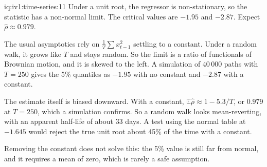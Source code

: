 \begin{solution}{iq:iv1:time-series:11}
Under a unit root, the regressor is non-stationary, so the statistic has a non-normal limit. The critical values are $-1.95$ and $-2.87$. Expect $\hat{\rho} \approx 0.979$.

The usual asymptotics rely on $\frac{1}{T}\sum x_{t - 1}^2$ settling to a constant. Under a random walk, it grows like $T$ and stays random. So the limit is a ratio of functionals of Brownian motion, and it is skewed to the left. A simulation of $40\,000$ paths with $T = 250$ gives the 5\% quantiles as $-1.95$ with no constant and $-2.87$ with a constant.

The estimate itself is biased downward. With a constant, $\mathbb{E}\hat{\rho} \approx 1 - 5.3/T$, or $0.979$ at $T = 250$, which a simulation confirms. So a random walk looks mean-reverting, with an apparent half-life of about 33 days. A test using the normal table at $-1.645$ would reject the true unit root about 45\% of the time with a constant.

Removing the constant does not solve this: the 5\% value is still far from normal, and it requires a mean of zero, which is rarely a safe assumption.



\end{solution}

